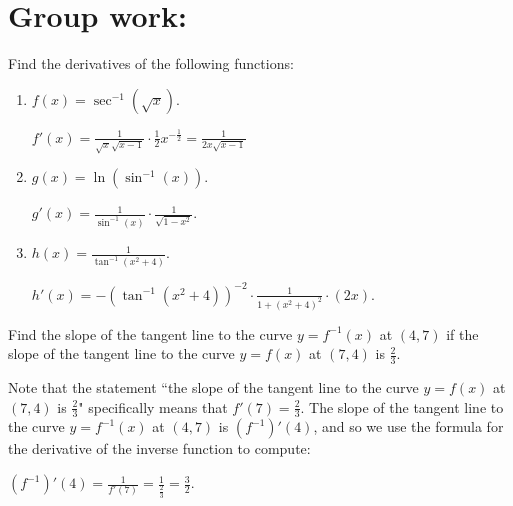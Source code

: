 \documentclass[nooutcomes]{ximera}
\begin{document}
		
		

	
	
	
	
	

\section{Group work:}



\begin{problem}
Find the derivatives of the following functions:
	\begin{enumerate}
	
	\item  $f(x) = \sec^{-1} (\sqrt{x})$.
		\begin{freeResponse}
		$f'(x) = \frac{1}{\sqrt{x} \sqrt{x - 1}} \cdot \frac{1}{2} x^{-\frac{1}{2}} = \frac{1}{2x\sqrt{x-1}}$
		\end{freeResponse}
		
		
		
	\item  $g(x) = \ln (\sin^{-1}(x))$.
		\begin{freeResponse}
		$g'(x) = \frac{1}{\sin^{-1}(x)} \cdot \frac{1}{\sqrt{1-x^2}}$.
		\end{freeResponse}
		
		
		
	\item  $h(x) = \frac{1}{\tan^{-1}(x^2 + 4)}$.  
		\begin{freeResponse}
		$h'(x) = - \left( \tan^{-1}(x^2 + 4) \right)^{-2} \cdot \frac{1}{1 + (x^2 + 4)^2} \cdot (2x)$.
		\end{freeResponse}
		
		
		
	\end{enumerate}
		
		
\end{problem}
















\begin{problem}
Find the slope of the tangent line to the curve $y = f^{-1}(x)$ at $(4,7)$ if the slope of the tangent line to the curve $y=f(x)$ at $(7,4)$ is $\frac{2}{3}$.  
		\begin{freeResponse}
		Note that the statement ``the slope of the tangent line to the curve $y=f(x)$ at $(7,4)$ is $\frac{2}{3}$" specifically means that $f'(7) = \frac{2}{3}$.  The slope of the tangent line to the curve $y = f^{-1}(x)$ at $(4,7)$ is $(f^{-1})'(4)$, and so we use the formula for the derivative of the inverse function to compute:
		
		$(f^{-1})'(4) = \frac{1}{f'(7)} = \frac{1}{\frac{2}{3}} = \frac{3}{2}$.
		\end{freeResponse}
		
		
		

\end{problem}
	
\end{document}
